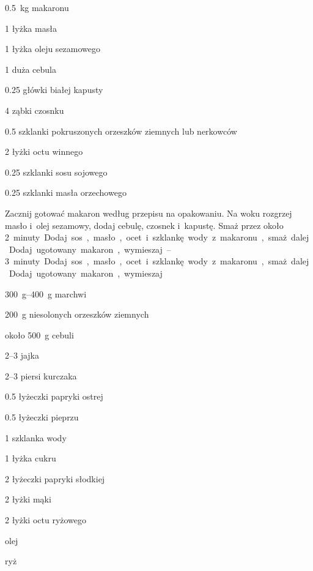 \documentclass[../kucharek.tex]{subfiles}
\begin{document}

\begin{Ingred}
    \item \qty{.5}{\kilo\gram} makaronu
    \item \num{1} łyżka masła
    \item \num{1} łyżka oleju sezamowego
    \item \num{1} duża cebula
    \item \num{.25} główki białej kapusty
    \item \num{4} ząbki czosnku
    \item \num{.5} szklanki pokruszonych orzeszków ziemnych lub nerkowców
    \item \num{2} łyżki octu winnego
    \item \num{.25} szklanki sosu sojowego
    \item \num{.25} szklanki masła orzechowego
\end{Ingred}

Zacznij gotować makaron według przepisu na opakowaniu. Na woku rozgrzej masło
i~olej sezamowy, dodaj cebulę, czosnek i~kapustę. Smaż przez około
\qtyrange{2}{3} minuty. Dodaj sos, masło, ocet i~szklankę wody z~makaronu, smaż
dalej. Dodaj ugotowany makaron, wymieszaj.


\begin{Ingred}
    \item \qtyrange{300}{400}{\gram} marchwi
    \item \qty{200}{\gram} niesolonych orzeszków ziemnych
    \item około \qty{500}{\gram} cebuli
    \item \numrange{2}{3} jajka
    \item \numrange{2}{3} piersi kurczaka
    \item \num{.5} łyżeczki papryki ostrej
    \item \num{.5} łyżeczki pieprzu
    \item \num{1} szklanka wody
    \item \num{1} łyżka cukru
    \item \num{2} łyżeczki papryki słodkiej
    \item \num{2} łyżki mąki
    \item \num{2} łyżki octu ryżowego
    \item olej
    \item ryż
\end{Ingred}
\end{document}
